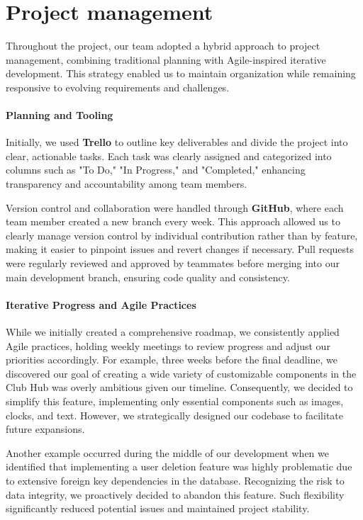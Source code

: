\chapter{Project management}
\label{chap:project-management}
Throughout the project, our team adopted a hybrid approach to project
management, combining traditional planning with Agile-inspired iterative
development. This strategy enabled us to maintain organization while
remaining responsive to evolving requirements and challenges.

\subsubsection{Planning and Tooling}\label{Planning and Tooling}

Initially, we used \textbf{Trello} to outline key deliverables and
divide the project into clear, actionable tasks. Each task was clearly
assigned and categorized into columns such as "To Do," "In Progress,"
and "Completed," enhancing transparency and accountability among team
members.

Version control and collaboration were handled through \textbf{GitHub},
where each team member created a new branch every week. This approach
allowed us to clearly manage version control by individual contribution
rather than by feature, making it easier to pinpoint issues and revert
changes if necessary. Pull requests were regularly reviewed and approved
by teammates before merging into our main development branch, ensuring
code quality and consistency.

\subsubsection{Iterative Progress and Agile Practices}\label{Iterative Progress and Agile Practices}

While we initially created a comprehensive roadmap, we consistently
applied Agile practices, holding weekly meetings to review progress and
adjust our priorities accordingly. For example, three weeks before the
final deadline, we discovered our goal of creating a wide variety of
customizable components in the Club Hub was overly ambitious given our
timeline. Consequently, we decided to simplify this feature,
implementing only essential components such as images, clocks, and text.
However, we strategically designed our codebase to facilitate future
expansions.

Another example occurred during the middle of our development when we
identified that implementing a user deletion feature was highly
problematic due to extensive foreign key dependencies in the database.
Recognizing the risk to data integrity, we proactively decided to
abandon this feature. Such flexibility significantly reduced potential
issues and maintained project stability.

